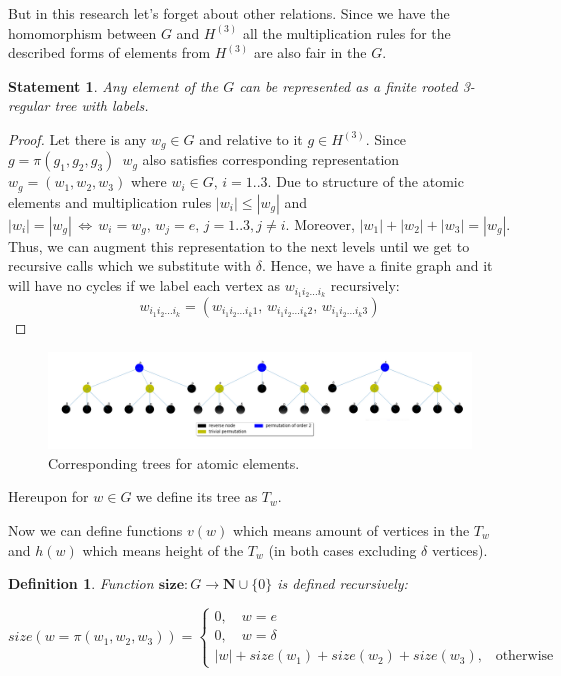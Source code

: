 \documentclass[a4paper,12pt]{amsart}
\newtheorem{definition}{Definition}
\newtheorem{statement}{Statement}
\begin{document}
But in this research let's forget about other relations. Since we have the homomorphism
between $G$ and $H^{(3)}$ all the multiplication rules for the described forms of elements
from $H^{(3)}$ are also fair in the $G$.
\\

\begin{statement}
	Any element of the $G$ can be represented as a finite rooted 3-regular tree with labels.
\end{statement}

\begin{proof}

	Let there is any $w_g \in G$ and relative to it $g \in H^{(3)}$. Since $g = \pi (g_1, g_2, g_3)\,$
	$w_g$ also satisfies corresponding representation $w_g = (w_1, w_2, w_3)$ where $w_i \in G, \, i = 1..3$.
	Due to structure of the atomic elements and multiplication rules $|w_i| \le |w_g|$ and
	$|w_i| = |w_g| \, \Leftrightarrow \, w_i = w_g, \, w_j = e, \, j = 1..3, j \ne i$.
	Moreover, $|w_1| + |w_2| + |w_3| = |w_g|$. Thus, we can augment this representation to the next
	levels until we get to recursive calls which we substitute with $\delta$. Hence, we have a finite
	graph and it will have no cycles if we label each vertex as $w_{i_1 i_2 ... i_k}$ recursively:
	$$
	w_{i_1 i_2 ... i_k} = (w_{i_1 i_2 ... i_k 1},\, w_{i_1 i_2 ... i_k 2},\, w_{i_1 i_2 ... i_k 3})
	$$



\end{proof}


\begin{figure}[h]
	\centering
	\includegraphics[scale=0.13]{../graphs/a_b_c.png}
	\caption{Corresponding trees for atomic elements.}
	\label{a_b_c}
\end{figure}

Hereupon for $w \in G$ we define its tree as $T_w$.

Now we can define functions $v(w)$ which means amount of vertices in the $T_w$ and
$h(w)$ which means height of the $T_w$ (in both cases excluding $\delta$ vertices).

\theoremstyle{definition}
\begin{definition}
	Function $\textbf{size} : G \rightarrow \mathbf{N} \cup \{0\}$ is defined recursively:

	\begin{equation}
	\label{size}
	size(w = \pi (w_1, w_2, w_3)) =
	\begin{cases}
	0, \quad  w = e \\
	0, \quad  w = \delta  \\
	|w| + size(w_1) + size(w_2) + size(w_3)\text{,} \quad \text{otherwise}
	\end{cases}
	\end{equation}
\end{definition}
\end{document}
